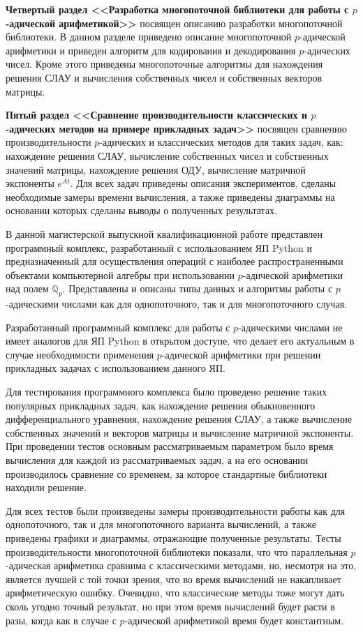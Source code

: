 \documentclass[master, och, autoref, times]{sty/SCWorks}
\theoremstyle{plain}
\theoremstyle{definition}
\numberwithin{equation}{section}
\begin{document}
\textbf{Четвертый раздел <<Разработка многопоточной библиотеки для работы с $p$-адической арифметикой>>} посвящен описанию разработки многопоточной библиотеки. В данном разделе приведено описание многопоточной $p$-адической арифметики и приведен алгоритм для кодирования и декодирования $p$-адических чисел. Кроме этого приведены многопоточные алгоритмы для нахождения решения СЛАУ и вычисления собственных чисел и собственных векторов матрицы.

\textbf{Пятый раздел <<Сравнение производительности классических и $p$-адических методов на примере прикладных задач>>} посвящен сравнению производительности $p$-адических и классических методов для таких задач, как: нахождение решения СЛАУ, вычисление собственных чисел и собственных значений матрицы, нахождение решения ОДУ, вычисление матричной экспоненты $e^{At}$. Для всех задач приведены описания экспериментов, сделаны необходимые замеры времени вычисления, а также приведены \mbox{диаграммы} на основании которых сделаны выводы о полученных \mbox{результатах}.


\conclusion

В данной магистерской выпускной квалификационной работе \mbox{представлен} программный комплекс, разработанный с использованием ЯП Python и предназначенный для осуществления операций с наиболее распространенными объектами компьютерной алгебры при \mbox{использовании} \mbox{$p$-адической} арифметики над полем $\mathbb{Q}_p$. Представлены и описаны типы \mbox{данных} и алгоритмы работы с \mbox{$p$-адическими} числами как для \mbox{однопоточного}, так и для многопоточного случая.

Разработанный программный комплекс для работы с $p$-адическими \mbox{числами} не имеет аналогов для ЯП Python в открытом доступе, что делает его актуальным в случае необходимости применения $p$-адической \mbox{арифметики} при решении прикладных задачах с использованием данного ЯП.

Для тестирования программного комплекса было проведено решение таких популярных прикладных задач, как нахождение решения \mbox{обыкновенного} дифференциального уравнения, нахождение решения СЛАУ, а также вычисление собственных значений и векторов матрицы и вычисление матричной экспоненты. При проведении тестов  основным рассматриваемым параметром было время вычисления для каждой из рассматриваемых задач, а на его основании производилось сравнение со временем, за которое \mbox{стандартные} библиотеки находили решение.

Для всех тестов были произведены замеры производительности работы как для однопоточного, так и для многопоточного варианта \mbox{вычислений}, а также приведены графики и диаграммы, отражающие полученные \mbox{результаты}. Тесты производительности многопоточной библиотеки показали, что что параллельная $p$-адическая арифметика сравнима с классическими методами, но, несмотря на это, является лучшей с той точки зрения, что во время вычислений не накапливает арифметическую ошибку. Очевидно, что классические методы тоже могут дать сколь угодно точный результат, но при этом время вычислений будет расти в разы, когда как в случае с $p$-адической арифметикой время будет константным.
\end{document}
